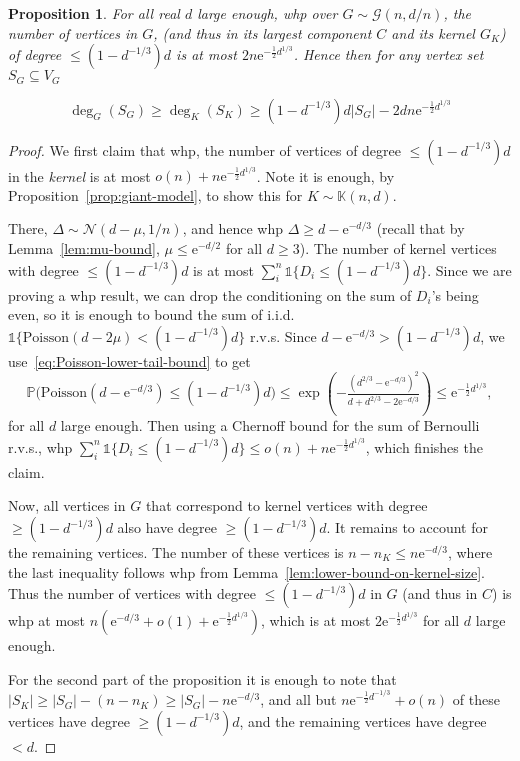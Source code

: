 \documentclass[11pt]{article}
\theoremstyle{plain}
\newtheorem{proposition}[theorem]{Proposition}
\newcommand{\G}{\mathcal{G}}
\newcommand{\emm}{\mathrm{e}}
\newcommand{\Nc}{\mathcal{N}}
\renewcommand{\P}{\mathds{P}}
\newcommand{\1}{\mathbb{1}}
\newcommand{\Kb}{\mathbb{K}}
\newcommand{\Poisson}{\text{Poisson}}
\begin{document}
\begin{proposition}\label{prop:exponentially-few-small-degree-vertices}
For all real \(d\) large enough, whp over \(G\sim\G(n,d/n)\), the number of vertices in \(G\), (and thus in its largest component \(C\) and its kernel \(G_K\)) of degree \(\leq(1-d^{-1/3})d\) is at most \(2n\emm^{-\frac 12 d^{1/3}}\). Hence then for any vertex set \(S_G\subseteq V_G\)

    \[
    \deg_G(S_G) \geq \deg_K(S_K) \geq (1-d^{-1/3})d|S_G| - 2dn\emm^{-\frac 12d^{1/3}}
    \]
\end{proposition}
\begin{proof}
    We first claim that whp, the number of vertices of degree \(\leq (1-d^{-1/3})d\) in the \textit{kernel} is at most \(o(n) + n\emm^{-\frac{1}{2}d^{1/3}}\). Note it is enough, by Proposition~\ref{prop:giant-model}, to show this for \(K\sim\Kb(n,d)\).
    
    There, \(\Delta\sim\Nc(d-\mu,1/n)\), and hence whp \(\Delta \geq d-\emm^{-d/3}\) (recall that by Lemma~\ref{lem:mu-bound}, \(\mu\leq \emm^{-d/2}\) for all \(d\geq 3\)). The number of kernel vertices with degree \(\leq (1-d^{-1/3})d\) is at most \(\sum_i^n \1\{D_i \leq (1-d^{-1/3})d\}\). Since we are proving a whp result, we can drop the conditioning on the sum of \(D_i\)'s being even, so it is enough to bound the sum of i.i.d. \(\1\{\Poisson(d-2\mu) < (1-d^{-1/3})d\}\) r.v.s. Since \(d - \emm^{-d/3} > (1-d^{-1/3})d\), we use~\eqref{eq:Poisson-lower-tail-bound} to get
    \[
    \P\Big(\Poisson(d-\emm^{-d/3}) \leq (1-d^{-1/3})d\Big) \leq \exp\left(-\tfrac{(d^{2/3}-\emm^{-d/3})^2}{d+d^{2/3}-2\emm^{-d/3}}\right)\leq \emm^{-\frac 12 d^{1/3}},
    \] for all \(d\) large enough. Then using a Chernoff bound for the sum of Bernoulli r.v.s., whp \(\sum_i^n \1\{D_i \leq (1-d^{-1/3})d\} \leq o(n) + n\emm^{-\frac 12 d^{1/3}}\), which finishes the claim.

    Now, all vertices in \(G\) that correspond to kernel vertices with degree \(\geq (1-d^{-1/3})d\) also have degree \(\geq (1-d^{-1/3})d\). It remains to account for the remaining vertices. The number of these vertices is \(n - n_K \leq n\emm^{-d/3}\), where the last inequality follows whp from Lemma~\ref{lem:lower-bound-on-kernel-size}. Thus the number of vertices with degree \(\leq (1-d^{-1/3})d\) in \(G\) (and thus in \(C\)) is whp at most \(n (\emm^{-d/3} + o(1) + \emm^{-\frac 12 d^{1/3}})\), which is at most \(2\emm^{-\frac 12 d^{1/3}}\) for all \(d\) large enough.

    For the second part of the proposition it is enough to note that \(|S_K|\geq |S_G|-(n - n_K) \geq |S_G| - n\emm^{-d/3}\), and all but \(n\emm^{-\frac 12 d^{-1/3}} + o(n)\) of these vertices have degree \(\geq (1-d^{-1/3})d\), and the remaining vertices have degree \(<d\). 


\end{proof}
\end{document}
